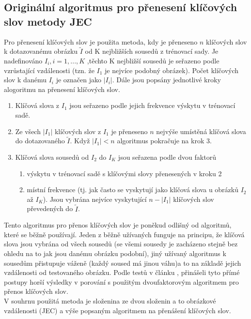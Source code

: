 \documentclass[czech,BP]{thesiskiv}
\begin{document}
\subsection{Originální algoritmus pro přenesení klíčových slov metody JEC}
\par Pro přenesení klíčových slov je použita metoda, kdy je přeneseno $n$ klíčových slov k dotazovanému obrázku $\tilde{I}$ od K nejbližších sousedů z trénovací sady. Je nadefinováno $I_{i}, i = 1, ..., K$ ,těchto K nejbližší sousedů je seřazeno podle vzrůstající vzdálenosti (tzn. že $I_{1} $ je nejvíce podobný obrázek). Počet klíčových slov k danému $I_{i}$ je označen jako $|I_{i}|$. Dále jsou popsány jednotlivé kroky alogoritmu na přenesení klíčových slov.
\begin{enumerate}
	\item Klíčová slova z $I_{1}$ jsou seřazeno podle jejich frekvence výskytu v trénovací sadě.
	\item Ze všech $|I_{1}|$ klíčových slov z $I_{1}$ je přeneseno $n$ nejvýše umístěná klíčová slova do dotazovaného $\tilde{I}$. Když $|I_{1}| < n$ algoritmus pokračuje na krok 3. 
	\item Klíčová slova sousedů od $I_{2}$ do $I_{K}$ jsou seřazena podle dvou faktorů
	\begin{enumerate}
		\item výskytu v trénovací sadě s klíčovými slovy přenesených v kroku 2
		\item místní frekvence (tj. jak často se vyskytují jako klíčová slova u obrázků $I_{2}$ až $I_{K}$). Jsou vybrána nejvíce vyskytující $n-|I_{1}|$ klíčových slov převedených do $\tilde{I}$.
	\end{enumerate}
\end{enumerate}

\par Tento algoritmus pro přenos klíčových slov je poněkud odlišný od algoritmů, které se běžně používají. Jeden z běžně užívaných funguje na principu, že klíčová slova jsou vybrána od všech sousedů (se všemi sousedy je zacházeno stejně bez ohledu na to jak jsou danému obrázku podobní), jiný užívaný algoritmus k sousedům přistupuje váženě (každý soused má jinou váhu)a to na základě jejich vzdálenosti od testovaného obrázku. Podle testů v článku \citep{JEC}, přinášeli tyto přímé postupy horší výsledky v porování s použitým dvoufaktorovým algoritmem pro přenos klíčových slov. \\
V souhrnu použitá metoda je složenina ze dvou složenin a to obrázkové vzdálenosti (JEC) a výše popsaným algoritmem na přenášení klíčových slov. 
 
\end{document}
